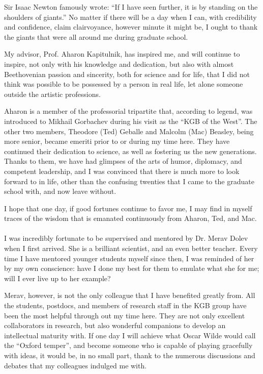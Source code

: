 Sir Isaac Newton famously wrote: ``If I have seen further, it is by standing on the shoulders of giants.'' No matter if there will be a day when I can, with credibility and confidence, claim clairvoyance, however minute it might be, I ought to thank the giants that were all around me during graduate school.

My advisor, Prof. Aharon Kapitulnik, has inspired me, and will continue to inspire, not only with his knowledge and dedication, but also with almost Beethovenian passion and sincerity, both for science and for life, that I did not think was possible to be possessed by a person in real life, let alone someone outside the artistic professions.

Aharon is a member of the professorial tripartite that, according to legend, was introduced to Mikhail Gorbachev during his visit as the ``KGB of the West''. The other two members, Theodore (Ted) Geballe and Malcolm (Mac) Beasley, being more senior, became emeriti prior to or during my time here. They have continued their dedication to science, as well as fostering us the new generations. Thanks to them, we have had glimpses of the arts of humor, diplomacy, and competent leadership, and I was convinced that there is much more to look forward to in life, other than the confusing twenties that I came to the graduate school with, and now leave without.

I hope that one day, if good fortunes continue to favor me, I may find in myself traces of the wisdom that is emanated continuously from Aharon, Ted, and Mac.

\paragraph{}
I was incredibly fortunate to be supervised and mentored by Dr. Merav Dolev when I first arrived. She is a brilliant scientist, and an even better teacher. Every time I have mentored younger students myself since then, I was reminded of her by my own conscience: have I done my best for them to emulate what she for me; will I ever live up to her example?

Merav, however, is not the only colleague that I have benefited greatly from. All the students, postdocs, and members of research staff in the KGB group have been the most helpful through out my time here. They are not only excellent collaborators in research, but also wonderful companions to develop an intellectual maturity with. If one day I will achieve what Oscar Wilde would call the ``Oxford temper'', and become someone who is capable of playing gracefully with ideas, it would be, in no small part, thank to the numerous discussions and debates that my colleagues indulged me with.

